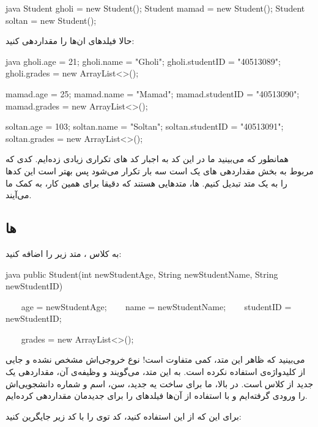 \begin{codebox}{java}
Student gholi = new Student();  
Student mamad = new Student();  
Student soltan = new Student();
\end{codebox}

حالا فیلدهای ان‌ها را مقداردهی کنید:

\begin{codebox}{java}
gholi.age = 21;  
gholi.name = "Gholi";  
gholi.studentID = "40513089";  
gholi.grades = new ArrayList<>();  
  
mamad.age = 25;  
mamad.name = "Mamad";  
mamad.studentID = "40513090";  
mamad.grades = new ArrayList<>();  
  
soltan.age = 103;  
soltan.name = "Soltan";  
soltan.studentID = "40513091";  
soltan.grades = new ArrayList<>();
\end{codebox}

همانطور که می‌بینید ما در این کد به اجبار کد های تکراری زیادی زده‌ایم. کدی
که مربوط به بخش مقداردهی  های یک  است سه بار تکرار
می‌شود پس بهتر است این کدها را به یک متد تبدیل کنیم.
 ها، متدهایی هستند که دقیقا برای همین کار، به
کمک ما می‌آیند.

\subsection{ ها}

به کلاس  ، متد زیر را اضافه کنید:

\begin{codebox}{java}
public Student(int newStudentAge, String newStudentName, String newStudentID) {
    age = newStudentAge;
    name = newStudentName;
    studentID = newStudentID;

    grades = new ArrayList<>();  
}
\end{codebox}

می‌بینید که ظاهر این متد، کمی متفاوت است! نوع خروجی‌اش مشخص نشده و جایی از
کلیدواژه‌ی  استفاده نکرده است. به این متد،
 می‌گویند و وظیفه‌ی آن، مقداردهی یک 
جدید از کلاس  ‍است. در  بالا، ما
برای ساخت یه  جدید، سن، اسم و شماره دانشجویی‌اش را
ورودی گرفته‌ایم و با استفاده از آن‌ها فیلدهای  را
برای  جدیدمان مقداردهی کرده‌ایم.

برای این که از این  استفاده کنید، کد توی
 را با کد زیر جایگرین کنید:

